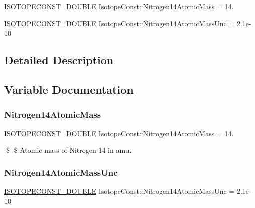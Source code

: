 \begin{DoxyCompactItemize}
\item 
\mbox{\hyperlink{group___isotope_const-_macros_ga8f45a7272ce02c0b4c65c44636ed719a}{I\+S\+O\+T\+O\+P\+E\+C\+O\+N\+S\+T\+\_\+\+D\+O\+U\+B\+LE}} \mbox{\hyperlink{group___isotope_const-_nitrogen-_n14_ga3e2c3df6248a1855aaef7d6898a3c0f0}{Isotope\+Const\+::\+Nitrogen14\+Atomic\+Mass}} = 14.
\item 
\mbox{\hyperlink{group___isotope_const-_macros_ga8f45a7272ce02c0b4c65c44636ed719a}{I\+S\+O\+T\+O\+P\+E\+C\+O\+N\+S\+T\+\_\+\+D\+O\+U\+B\+LE}} \mbox{\hyperlink{group___isotope_const-_nitrogen-_n14_gaac7eb639c1d800bf9eee4991199a746e}{Isotope\+Const\+::\+Nitrogen14\+Atomic\+Mass\+Unc}} = 2.\+1e-\/10
\end{DoxyCompactItemize}


\subsection{Detailed Description}


\subsection{Variable Documentation}
\mbox{\label{group___isotope_const-_nitrogen-_n14_ga3e2c3df6248a1855aaef7d6898a3c0f0}} 
\subsubsection{\texorpdfstring{Nitrogen14\+Atomic\+Mass}{Nitrogen14AtomicMass}}
{\footnotesize\ttfamily \mbox{\hyperlink{group___isotope_const-_macros_ga8f45a7272ce02c0b4c65c44636ed719a}{I\+S\+O\+T\+O\+P\+E\+C\+O\+N\+S\+T\+\_\+\+D\+O\+U\+B\+LE}} Isotope\+Const\+::\+Nitrogen14\+Atomic\+Mass = 14.}

\$ \$ Atomic mass of Nitrogen-\/14 in amu. \mbox{\label{group___isotope_const-_nitrogen-_n14_gaac7eb639c1d800bf9eee4991199a746e}} 
\subsubsection{\texorpdfstring{Nitrogen14\+Atomic\+Mass\+Unc}{Nitrogen14AtomicMassUnc}}
{\footnotesize\ttfamily \mbox{\hyperlink{group___isotope_const-_macros_ga8f45a7272ce02c0b4c65c44636ed719a}{I\+S\+O\+T\+O\+P\+E\+C\+O\+N\+S\+T\+\_\+\+D\+O\+U\+B\+LE}} Isotope\+Const\+::\+Nitrogen14\+Atomic\+Mass\+Unc = 2.\+1e-\/10}

